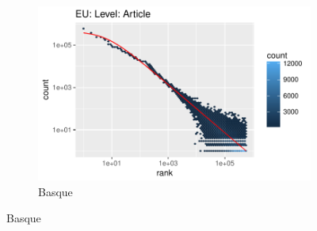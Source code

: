 \documentclass{article}
\begin{document}
\begin{figure}
\begin{subfigure}[b]{0.3\textwidth}
		\includegraphics[trim={0 0 2.2cm 0.6cm},clip, width=\textwidth]{EU_Article_mle.pdf}
		\caption{Basque}
		\label{fig:eu_mle}
	\end{subfigure}
	

\end{figure}
\end{document}
